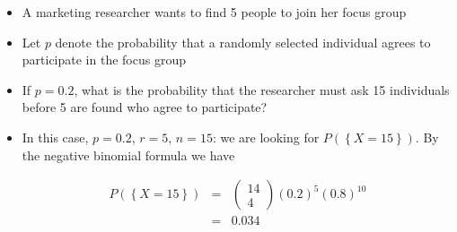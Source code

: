 \documentclass[smaller, handout]{beamer}\usepackage[]{graphicx}\usepackage[]{color}
\renewcommand{\Pr}{P}
\newenvironment{stepitemize}{\begin{itemize}[<+->]}{\end{itemize} }
\begin{document}
\begin{frame}{\secname}%


\begin{example}
\begin{stepitemize}

\item A marketing researcher wants to find 5 people to join her focus group

\item Let $p$ denote the probability that a randomly selected individual
agrees to participate in the focus group

\item If $p=0.2$, what is the probability that the researcher must ask 15
individuals before 5 are found who agree to participate?


\item In this case, $p=0.2$, $r=5$, $n=15$:  we are looking for $\Pr (\left\{
X=15\right\}).$ By the negative binomial formula we have

\begin{eqnarray*}
\Pr (\left\{ X=15\right\}) &=&\left(
\begin{array}{c}
14 \\
4%
\end{array}%
\right) \left( 0.2\right) ^{5}\left( 0.8\right) ^{10} \\
&=&0.034
\end{eqnarray*}
\end{stepitemize}
\end{example}
\end{frame}%
\end{document}
